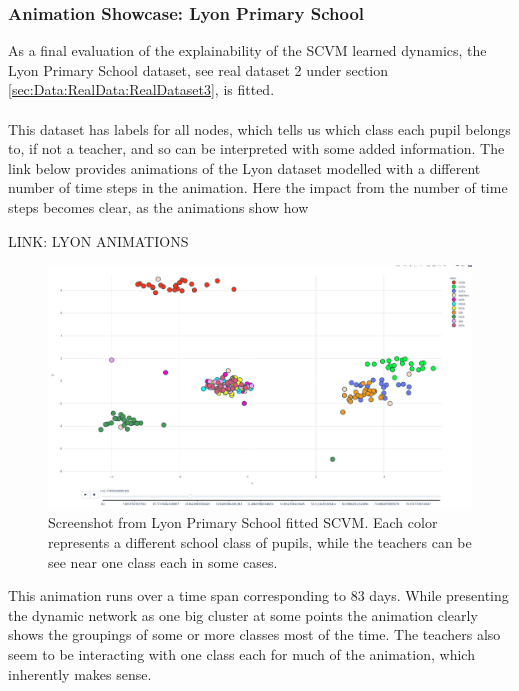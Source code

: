 \subsubsection{Animation Showcase: Lyon Primary School}
\label{sec:ResearchQuestion3:Lyon}
As a final evaluation of the explainability of the SCVM learned dynamics, the Lyon Primary School dataset, see real dataset 2 under section \ref{sec:Data:RealData:RealDataset3}, is fitted.
\\\\
This dataset has labels for all nodes, which tells us which class each pupil belongs to, if not a teacher, and so can be interpreted with some added information. The link below provides animations of the Lyon dataset modelled with a different number of time steps in the animation. Here the impact from the number of time steps becomes clear, as the animations show how  
\begin{center}
LINK: LYON ANIMATIONS
\end{center}
\begin{figure}[H]
    \centering
    \includegraphics[width=\textwidth]{0_images/lyon_screenshot.png}
    \caption{Screenshot from Lyon Primary School fitted SCVM. Each color represents a different school class of pupils, while the teachers can be see near one class each in some cases.}
    \label{fig:LyonScreenshot}
\end{figure}
\noindent
This animation runs over a time span corresponding to 83 days. While presenting the dynamic network as one big cluster at some points the animation clearly shows the groupings of some or more classes most of the time.
The teachers also seem to be interacting with one class each for much of the animation, which inherently makes sense.